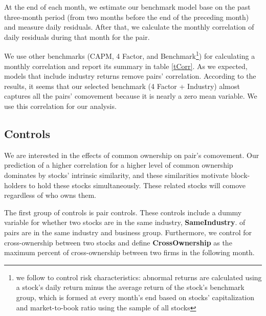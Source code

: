 	At the end of each month, we estimate our benchmark model base on the past three-month period (from two months before the end of the preceding month) and measure daily residuals.  After that, we calculate the monthly correlation of daily residuals during that month for the pair.
	
	We use other benchmarks (CAPM, 4 Factor, and Benchmark\footnote{we follow \cite{daniel1997measuring} to control risk characteristics: abnormal returns are calculated using a stock’s daily return minus the average return of
	the stock’s benchmark group, which is formed at every month’s end based on stocks’ capitalization and market-to-book ratio using the sample of all stocks}) for calculating a monthly correlation and report its summary in table \ref{tCorr}. 
	As we expected,  models that include industry returns remove pairs' correlation. According to the results, it seems that our selected benchmark (4 Factor + Industry) almost captures all the pairs' comovement because it is nearly a zero mean variable. We use this correlation for our analysis.
	
	
	
	
%			



\FloatBarrier


\subsection{Controls}

We are interested in the effects of common ownership on pair's comovement.
Our prediction of a higher correlation for a higher level of common ownership dominates by stocks' intrinsic similarity, and these similarities motivate block-holders to hold these stocks simultaneously. These related stocks will comove regardless of who owns them.

The first group of controls is pair controls. These controls include
a dummy variable for whether two stocks are in the same industry, \textbf{SameIndustry}.
of pairs are in the same industry and business group. Furthermore, we control for cross-ownership between two stocks and define  \textbf{CrossOwnership} as the maximum percent of cross-ownership between two firms in the following month.



